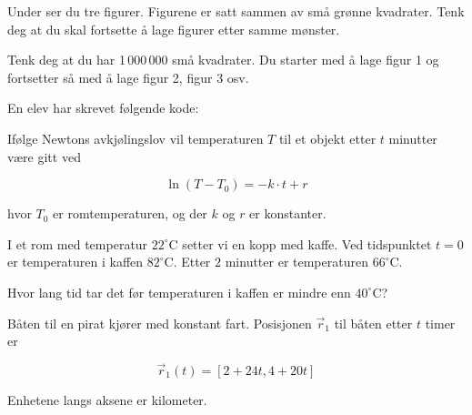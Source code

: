 
Under ser du tre figurer. Figurene er satt sammen av små grønne kvadrater.
Tenk deg at du skal fortsette å lage figurer etter samme mønster.

Tenk deg at du har 1\,000\,000 små kvadrater. Du starter med å lage figur 1 og
fortsetter så med å lage figur 2, figur 3 osv.

\newpage
{} \vs
{}

En elev har skrevet følgende kode:

Ifølge Newtons avkjølingslov vil temperaturen $T$ til et objekt
etter $t$ minutter være gitt ved

\[
\ln(T - T_0) = -k \cdot t + r
\]

hvor $T_0$ er romtemperaturen, og der $k$ og $r$ er konstanter.

I et rom med temperatur $22^\circ\mathrm{C}$ setter vi en kopp
med kaffe. Ved tidspunktet $t = 0$ er temperaturen i kaffen
$82^\circ\mathrm{C}$. Etter $2$ minutter er temperaturen
$66^\circ\mathrm{C}$. \os

Hvor lang tid tar det før temperaturen i kaffen er mindre enn
$40^\circ\mathrm{C}$?

Båten til en pirat kjører med konstant fart. Posisjonen
$\vec{r}_1$ til båten etter $t$ timer er

\[
\vec{r}_1(t) = [2 + 24t, 4 + 20t]
\]

Enhetene langs aksene er kilometer.


